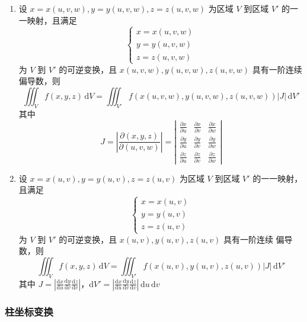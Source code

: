 \begin{enumerate}
    \item 设 $x=x(u,v,w),y=y(u,v,w),z=z(u,v,w)$ 为区域 $V$ 到区域 $V'$ 的一一映射，且满足
          \[
              \begin{cases}
                  x=x(u,v,w) \\
                  y=y(u,v,w) \\
                  z=z(u,v,w)
              \end{cases}
          \]
          为 $V$ 到 $V'$ 的可逆变换，且 $x(u,v,w),y(u,v,w),z(u,v,w)$ 具有一阶连续偏导数，则
          \[
              \iiint_{V} f(x,y,z) \, \mathrm{d}V = \iiint_{V'} f(x(u,v,w),y(u,v,w),z(u,v,w)) \left| J \right| \, \mathrm{d}V'
          \]
          其中
          \[J = \left| \frac{\partial(x,y,z)}{\partial(u,v,w)} \right| = \left| \begin{array}{ccc}
                  \frac{\partial x}{\partial u} & \frac{\partial x}{\partial v} & \frac{\partial x}{\partial w} \\
                  \frac{\partial y}{\partial u} & \frac{\partial y}{\partial v} & \frac{\partial y}{\partial w} \\
                  \frac{\partial z}{\partial u} & \frac{\partial z}{\partial v} & \frac{\partial z}{\partial w}
              \end{array} \right|
          \]
    \item 设 $x=x(u,v),y=y(u,v),z=z(u,v)$ 为区域 $V$ 到区域 $V'$ 的一一映射，且满足
          \[
              \begin{cases}
                  x=x(u,v) \\
                  y=y(u,v) \\
                  z=z(u,v)
              \end{cases}
          \]
          为 $V$ 到 $V'$ 的可逆变换，且 $x(u,v),y(u,v),z(u,v)$ 具有一阶连续
          偏导数，则
          \[
              \iiint_{V} f(x,y,z) \, \mathrm{d}V = \iiint_{V'} f(x(u,v),y(u,v),z(u,v)) \left| J \right| \, \mathrm{d}V'
          \]
          其中 $J = \left| \frac{\mathrm{d}x}{\mathrm{d}u} \frac{\mathrm{d}y}{\mathrm{d}v} \frac{\mathrm{d}z}{\mathrm{d}v} \right|$，$\mathrm{d}V' = \left| \frac{\mathrm{d}x}{\mathrm{d}u} \frac{\mathrm{d}y}{\mathrm{d}v} \frac{\mathrm{d}z}{\mathrm{d}v} \right| \, \mathrm{d}u \, \mathrm{d}v$
\end{enumerate}

\subsubsection{柱坐标变换}

